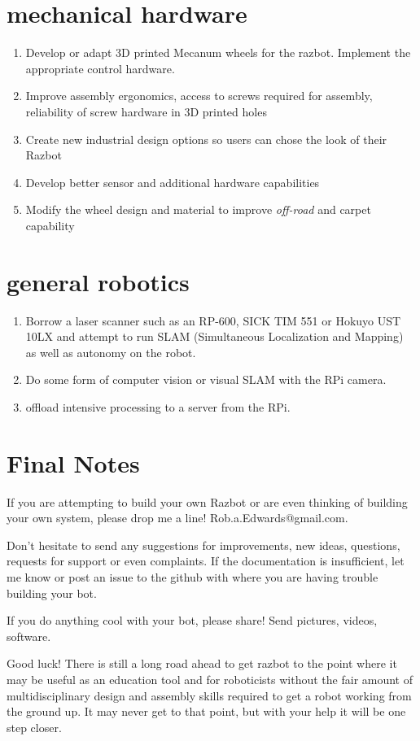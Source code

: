\documentclass[12pt,titlepage,oneside]{memoir}
\begin{document}
\section{mechanical hardware}
\begin{enumerate}
\item Develop or adapt 3D printed Mecanum wheels for the razbot. Implement the appropriate control hardware.
\item Improve assembly ergonomics, access to screws required for assembly, reliability of screw hardware in 3D printed holes
\item Create new industrial design options so users can chose the look of their Razbot
\item Develop better sensor and additional hardware capabilities
\item Modify the wheel design and material to improve \textit{off-road} and carpet capability
\end{enumerate}

\section{general robotics}
\begin{enumerate}
\item Borrow a laser scanner such as an RP-600, SICK TIM 551 or Hokuyo UST 10LX and attempt to run SLAM (Simultaneous Localization and Mapping) as well as autonomy on the robot.
\item Do some form of computer vision or visual SLAM with the RPi camera.
\item offload intensive processing to a server from the RPi.
\end{enumerate}

\section{Final Notes}
If you are attempting to build your own Razbot or are even thinking of building your own system, please drop me a line! Rob.a.Edwards@gmail.com.

Don't hesitate to send any suggestions for improvements, new ideas, questions, requests for support or even complaints. If the documentation is insufficient, let me know or post an issue to the github with where you are having trouble building your bot.

If you do anything cool with your bot, please share! Send pictures, videos, software.

Good luck! There is still a long road ahead to get razbot to the point where it may be useful as an education tool and for roboticists without the fair amount of multidisciplinary design and assembly skills required to get a robot working from the ground up. It may never get to that point, but with your help it will be one step closer.
\end{document}
